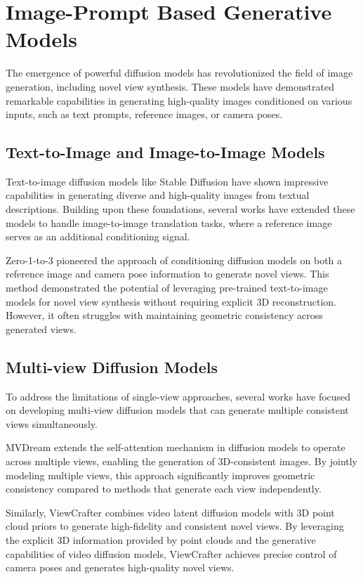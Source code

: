 \section{Image-Prompt Based Generative Models}\label{sec:prompt-image}

The emergence of powerful diffusion models has revolutionized the field of image generation, including novel view synthesis. These models have demonstrated remarkable capabilities in generating high-quality images conditioned on various inputs, such as text prompts, reference images, or camera poses.


\subsection{Text-to-Image and Image-to-Image Models}

Text-to-image diffusion models like Stable Diffusion \cite{stablediffusion} have shown impressive capabilities in generating diverse and high-quality images from textual descriptions. Building upon these foundations, several works have extended these models to handle image-to-image translation tasks, where a reference image serves as an additional conditioning signal.

Zero-1-to-3 \cite{zero1to3} pioneered the approach of conditioning diffusion models on both a reference image and camera pose information to generate novel views. This method demonstrated the potential of leveraging pre-trained text-to-image models for novel view synthesis without requiring explicit 3D reconstruction. However, it often struggles with maintaining geometric consistency across generated views.


\subsection{Multi-view Diffusion Models}

To address the limitations of single-view approaches, several works have focused on developing multi-view diffusion models that can generate multiple consistent views simultaneously.

MVDream \cite{mvdream} extends the self-attention mechanism in diffusion models to operate across multiple views, enabling the generation of 3D-consistent images. By jointly modeling multiple views, this approach significantly improves geometric consistency compared to methods that generate each view independently.

Similarly, ViewCrafter \cite{viewcrafter} combines video latent diffusion models \cite{videolatentdiffusion} with 3D point cloud priors to generate high-fidelity and consistent novel views. By leveraging the explicit 3D information provided by point clouds and the generative capabilities of video diffusion models, ViewCrafter achieves precise control of camera poses and generates high-quality novel views.

